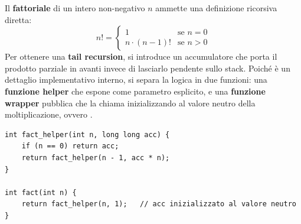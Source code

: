\begin{codeexample}

  Il \textbf{fattoriale} di un intero non-negativo $n$ ammette una
  definizione ricorsiva diretta:
  \[
    n! = \begin{cases}
      1              & \text{se } n = 0 \\
      n \cdot (n-1)! & \text{se } n > 0
    \end{cases}
  \]
  Per ottenere una \textbf{tail recursion}, si introduce un accumulatore
   che porta il prodotto parziale in avanti invece di
  lasciarlo pendente sullo stack. Poiché  è un dettaglio
  implementativo interno, si separa la logica in due funzioni: una
  \textbf{funzione helper} che espone  come parametro
  esplicito, e una \textbf{funzione wrapper} pubblica che la chiama
  inizializzando  al valore neutro della moltiplicazione,
  ovvero .


  \begin{codebox}
    \begin{lstlisting}
int fact_helper(int n, long long acc) {
    if (n == 0) return acc;
    return fact_helper(n - 1, acc * n);
}

int fact(int n) {
    return fact_helper(n, 1);   // acc inizializzato al valore neutro
}
    \end{lstlisting}
  \end{codebox}

\end{codeexample}

